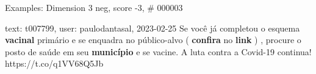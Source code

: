 \begin{frame}{Examples: Dimension 3 neg, score -3, \# 000003}
\footnotesize
\begin{alertblock}{text: t007799, user: paulodantasal, 2023-02-25}
Se você já completou o esquema \textbf{vacinal} primário e se enquadra no 
público-alvo ( \textbf{confira} no \textbf{link} ) , procure o posto de saúde 
em seu \textbf{município} e se vacine. A luta contra a Covid-19 continua! 
https://t.co/q1VV68Q5Jb 
\end{alertblock}
\end{frame}
